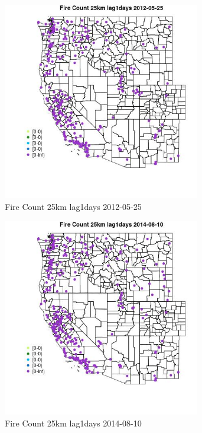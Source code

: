 \begin{figure} 
\centering  
\includegraphics[width=0.77\textwidth]{Code_Outputs/Report_ML_input_PM25_Step4_part_e_de_duplicated_aves_compiled_2019-05-18wNAs_MapObsFire_Count_25km_lag1days2012-05-25.jpg} 
\caption{\label{fig:Report_ML_input_PM25_Step4_part_e_de_duplicated_aves_compiled_2019-05-18wNAsMapObsFire_Count_25km_lag1days2012-05-25}Fire Count 25km lag1days 2012-05-25} 
\end{figure} 
 

\begin{figure} 
\centering  
\includegraphics[width=0.77\textwidth]{Code_Outputs/Report_ML_input_PM25_Step4_part_e_de_duplicated_aves_compiled_2019-05-18wNAs_MapObsFire_Count_25km_lag1days2014-08-10.jpg} 
\caption{\label{fig:Report_ML_input_PM25_Step4_part_e_de_duplicated_aves_compiled_2019-05-18wNAsMapObsFire_Count_25km_lag1days2014-08-10}Fire Count 25km lag1days 2014-08-10} 
\end{figure} 
 

